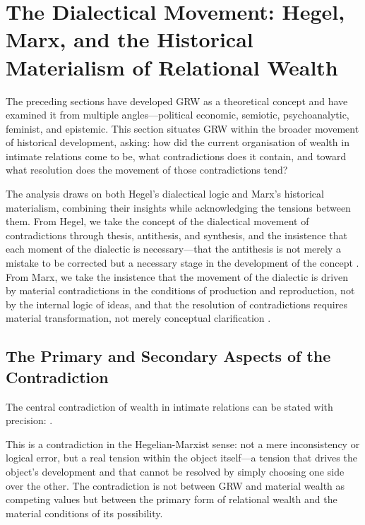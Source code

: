 \section{The Dialectical Movement: Hegel, Marx, and the Historical Materialism of Relational Wealth}
\label{p15:sec:hegel_marx}

\noindent
The preceding sections have developed GRW as a theoretical concept and have examined it from multiple angles---political economic, semiotic, psychoanalytic, feminist, and epistemic. This section situates GRW within the broader movement of historical development, asking: how did the current organisation of wealth in intimate relations come to be, what contradictions does it contain, and toward what resolution does the movement of those contradictions tend?

The analysis draws on both Hegel's dialectical logic and Marx's historical materialism, combining their insights while acknowledging the tensions between them. From Hegel, we take the concept of the dialectical movement of contradictions through thesis, antithesis, and synthesis, and the insistence that each moment of the dialectic is necessary---that the antithesis is not merely a mistake to be corrected but a necessary stage in the development of the concept \parencite{hegel1977}. From Marx, we take the insistence that the movement of the dialectic is driven by material contradictions in the conditions of production and reproduction, not by the internal logic of ideas, and that the resolution of contradictions requires material transformation, not merely conceptual clarification \parencite{marx1976}.

\subsection{The Primary and Secondary Aspects of the Contradiction}
\label{p15:subsec:primary_secondary}

\noindent
The central contradiction of wealth in intimate relations can be stated with precision: .

This is a contradiction in the Hegelian-Marxist sense: not a mere inconsistency or logical error, but a real tension within the object itself---a tension that drives the object's development and that cannot be resolved by simply choosing one side over the other. The contradiction is not between GRW and material wealth as competing values but between the primary form of relational wealth and the material conditions of its possibility.

